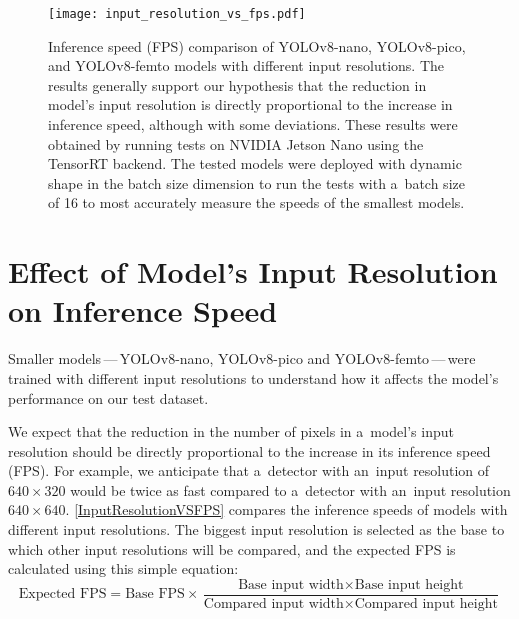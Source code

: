 \begin{figure}[H]
        \centering
        \texttt{[image: input\_resolution\_vs\_fps.pdf]}
        \caption{Inference speed (FPS) comparison of YOLOv8-nano, YOLOv8-pico, and
        YOLOv8-femto models with different input resolutions. The results generally
        support our hypothesis that the reduction in model's input resolution is directly
        proportional to the increase in inference speed, although with some
        deviations. These results were obtained by running tests on NVIDIA Jetson
        Nano using the TensorRT backend. The tested models were deployed with
        dynamic shape in the batch size dimension to run the tests with a~batch size
        of 16 to most accurately measure the speeds of the smallest models.}
        \label{InputResolutionVSFPS}
\end{figure}

\section{Effect of Model's Input Resolution on Inference Speed}
\label{InputResolutionVSFPSExperiment}

Smaller models\,---\,YOLOv8-nano, YOLOv8-pico and YOLOv8-femto\,---\,were
trained with different input resolutions to understand how it affects the
model's performance on our test dataset.

We expect that the reduction in the number of pixels in a~model's input
resolution should be directly proportional to the increase in its inference
speed (FPS). For example, we anticipate that a~detector with an~input resolution
of $640 \times 320$ would be twice as fast compared to a~detector with an~input
resolution $640 \times 640$. \autoref{InputResolutionVSFPS} compares the
inference speeds of models with different input resolutions. The biggest input
resolution is selected as the base to which other input resolutions will be
compared, and the expected FPS is calculated using this simple equation:
\begin{equation}
    \text{Expected FPS} = \text{Base FPS} \times \frac{\text{Base input width} \times \text{Base input height}}{\text{Compared input width} \times \text{Compared input height}}
\end{equation}


